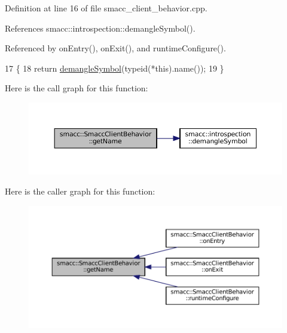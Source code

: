 Definition at line 16 of file smacc\+\_\+client\+\_\+behavior.\+cpp.



References smacc\+::introspection\+::demangle\+Symbol().



Referenced by on\+Entry(), on\+Exit(), and runtime\+Configure().


\begin{DoxyCode}
17 \{
18     \textcolor{keywordflow}{return} \hyperlink{namespacesmacc_1_1introspection_a2f495108db3e57604d8d3ff5ef030302}{demangleSymbol}(\textcolor{keyword}{typeid}(*this).name());
19 \}
\end{DoxyCode}
Here is the call graph for this function\+:
\nopagebreak
\begin{figure}[H]
\begin{center}
\leavevmode
\includegraphics[width=350pt]{classsmacc_1_1SmaccClientBehavior_ada2ec9b296106de2261d13ef22caf81c_cgraph}
\end{center}
\end{figure}
Here is the caller graph for this function\+:
\nopagebreak
\begin{figure}[H]
\begin{center}
\leavevmode
\includegraphics[width=350pt]{classsmacc_1_1SmaccClientBehavior_ada2ec9b296106de2261d13ef22caf81c_icgraph}
\end{center}
\end{figure}
\mbox{\label{classsmacc_1_1SmaccClientBehavior_aa817da149f366f6a28794c04eb0744b0}} 
